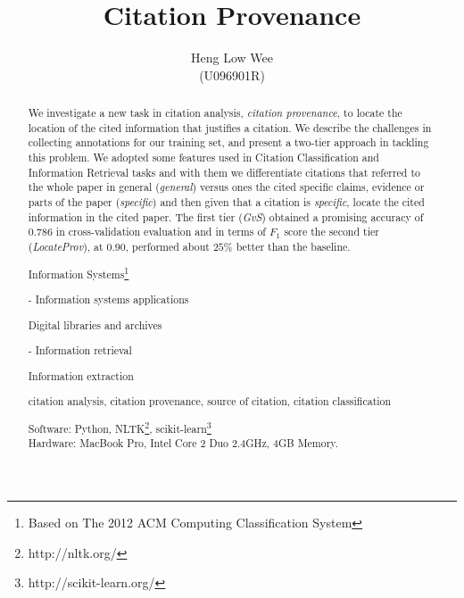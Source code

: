 \documentclass[hyp, 12pt]{socreport}
\begin{document}
\title{Citation Provenance}
\author{Heng Low Wee \\ (U096901R)}
\maketitle
\begin{abstract}
\paragraph{}
We investigate a new task in citation analysis, {\it citation provenance}, to locate the location of the cited information that justifies a citation. We describe the challenges in collecting annotations for our training set, and present a two-tier approach in tackling this problem. We adopted some features used in Citation Classification and Information Retrieval tasks and with them we differentiate citations that referred to the whole paper in general ({\it general}) versus ones the cited specific claims, evidence or parts of the paper ({\it specific}) and then given that a citation is {\it specific}, locate the cited information in the cited paper. The first tier ({\it GvS}) obtained a promising accuracy of $0.786$ in cross-validation evaluation and in terms of $F_1$ score the second tier ({\it LocateProv}), at $0.90$, performed about $25\%$ better than the baseline.

\begin{descriptors}
	\item Information Systems\footnote{Based on The 2012 ACM Computing Classification System}
	{\setlength\itemindent{30pt} \item - Information systems applications}
	{\setlength\itemindent{50pt} \item Digital libraries and archives}
	{\setlength\itemindent{30pt} \item - Information retrieval}
	{\setlength\itemindent{50pt} \item Information extraction}
\end{descriptors}
\begin{keywords}
	citation analysis, citation provenance, source of citation, citation classification
\end{keywords}
\begin{implement}
\begin{flushleft}
\hspace{5 mm}Software: Python, NLTK\footnote{http://nltk.org/}, scikit-learn\footnote{http://scikit-learn.org/} \nocite{scikit-learn}\\
\hspace{5 mm}Hardware: MacBook Pro, Intel Core 2 Duo 2.4GHz, 4GB Memory.
\end{flushleft}
\end{implement}
\end{abstract}
\end{document}
